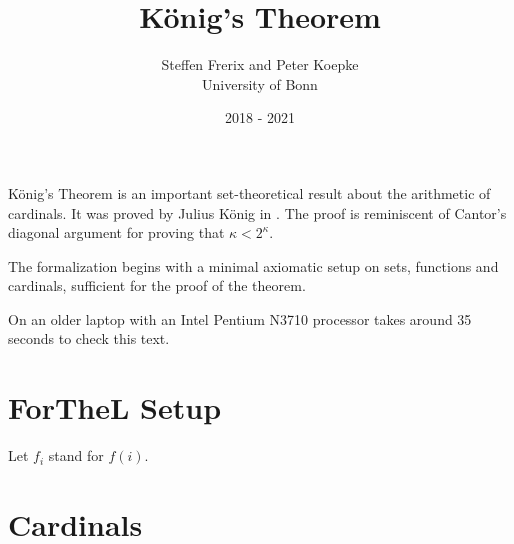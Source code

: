 \documentclass{article}
\title{König's Theorem}
\author{Steffen Frerix and Peter Koepke\\
University of Bonn}
\date{2018 - 2021}
\begin{document}
\maketitle

König's Theorem is an important set-theoretical result about the arithmetic of
cardinals.
It was proved by Julius König in \cite{Koenig1905}.
The proof is reminiscent of Cantor's diagonal argument for proving that $\kappa
< 2^\kappa$.

The formalization begins with a minimal axiomatic setup on sets, functions and
cardinals, sufficient for the proof of the theorem.

On an older laptop with an Intel Pentium N3710 processor \Naproche takes around
35 seconds to check this text.


\section{ForTheL Setup}

\begin{forthel}

  Let $f_{i}$ stand for $f(i)$.
\end{forthel}


\section{Cardinals}
\end{document}
